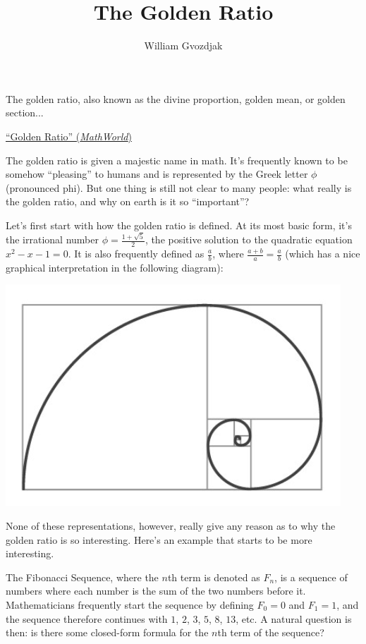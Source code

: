 \documentclass{article}
\title{The Golden Ratio}
\author{William Gvozdjak}
\begin{document}
\maketitle
\epigraph{
  The golden ratio, also known as the divine proportion, golden mean, or golden section...
}{\href{https://mathworld.wolfram.com/GoldenRatio.html}{``Golden Ratio'' (\emph{MathWorld})}}
The golden ratio is given a majestic name in math. It’s frequently known to be somehow “pleasing” to humans and is represented by the Greek letter $\phi$ (pronounced phi). But one thing is still not clear to many people: what really is the golden ratio, and why on earth is it so “important”? 

Let’s first start with how the golden ratio is defined. At its most basic form, it’s the irrational number $\phi = \frac{1+\sqrt5}2$, the positive solution to the quadratic equation $x^2-x-1=0$. It is also frequently defined as $\frac ab$, where $\frac{a+b}a = \frac ab$ (which has a nice graphical interpretation in the following diagram):

\begin{center}
    \includegraphics[scale=0.35]{images/golden-ratio.png}
\end{center}

None of these representations, however, really give any reason as to why the golden ratio is so interesting. Here’s an example that starts to be more interesting.

The Fibonacci Sequence, where the $n$th term is denoted as $F_n$, is a sequence of numbers where each number is the sum of the two numbers before it. Mathematicians frequently start the sequence by defining $F_0=0$ and $F_1=1$, and the sequence therefore continues with $1$, $2$, $3$, $5$, $8$, $13$, etc. A natural question is then: is there some closed-form formula for the $n$th term of the sequence?
\end{document}
